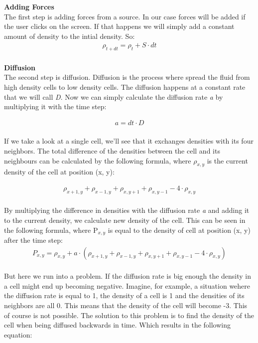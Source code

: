 \documentclass[a4paper,12pt]{article}
\begin{document}
\textbf{Adding Forces} \\

The first step is adding forces from a source. In our case forces will be added if the user clicks on the screen.
If that happens we will simply add a constant amount of density to the intial density. So:   \\

\[
\begin{array}{ll}
  \rho_{t+dt} = \rho_t + S \cdot dt
\end{array}
\] \\

\textbf{Diffusion} \\

The second step is diffusion.
Diffusion is the process where spread the fluid from high density cells to low density cells.
The diffusion happens at a constant rate that we will call \textit{D}. 
Now we can simply calculate the diffusion rate \textit{a} by multiplying it with the time step:

\[
\begin{array}{ll}
  a = dt \cdot D
\end{array}
\] \\

If we take a look at a single cell, we'll see that it exchanges densities with its four neighbors.
The total difference of the densities between the cell and its neighbours can be calculated by the following formula,
where $\rho_{x, y}$ is the current density of the cell at position (x, y):

\[
\begin{array}{ll}
	\rho_{x+1, y} + \rho_{x-1, y} + \rho_{x, y+1} + \rho_{x, y-1} - 4 \cdot \rho_{x, y}
\end{array}
\]  \\

By multiplying the difference in densities with the diffusion rate \textit{a} and adding it to the current density, we calculate new density of the cell. 
This can be seen in the following formula, where P$_{x, y}$ is equal to the density of cell at position (x, y) after the time step: \\

\[
\begin{array}{ll}
	P_{x, y} = \rho_{x, y} + a \cdot (\rho_{x+1, y} + \rho_{x-1, y} + \rho_{x, y+1} + \rho_{x, y-1} - 4 \cdot \rho_{x, y})
\end{array}
\]  \\

But here we run into a problem. If the diffusion rate is big enough the density in a cell might end up becoming negative.
Imagine, for example, a situation wehere the diffusion rate is equal to 1,  the density of a cell is 1 and the densities of its neighbors are all 0. This means that the density of the cell will become -3.
This of course is not possible.
The solution to this problem is to find the density of the cell when being diffused backwards in time. Which results in the following equation: \\
\end{document}
